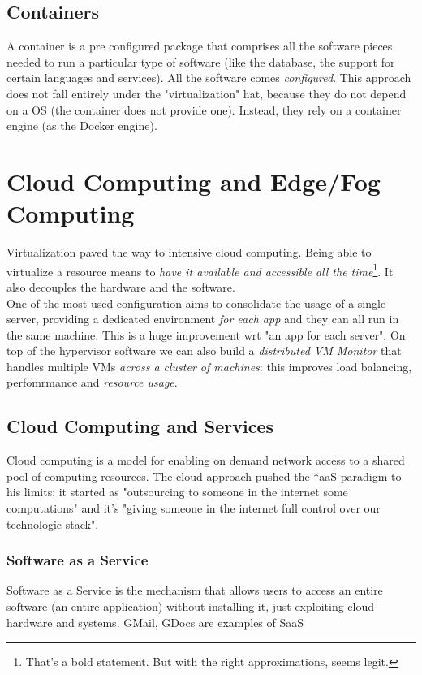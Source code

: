 \documentclass[10pt,a4paper]{article}
\begin{document}
			\subsection{Containers}
				A container is a pre configured package that comprises all the software pieces needed to run a particular type of software (like the database, the support for certain languages and services). All the software comes \emph{configured}. This approach does not fall entirely under the "virtualization" hat, because they do not depend on a OS (the container does not provide one). Instead, they rely on a container engine (as the Docker engine).
				
		\section{Cloud Computing and Edge/Fog Computing}
			Virtualization paved the way to intensive cloud computing. Being able to virtualize a resource means to \emph{have it available and accessible all the time}\footnote{That's a bold statement. But with the right approximations, seems legit.}. It also decouples the hardware and the software.\\
			One of the most used configuration aims to consolidate the usage of a single server, providing a dedicated environment \emph{for each app} and they can all run in the same machine. This is a huge improvement wrt "an app for each server". On top of the hypervisor software we can also build a \emph{distributed VM Monitor} that handles multiple VMs \emph{across a cluster of machines}: this improves load balancing, perfomrmance and \emph{resource usage}.\\
			
			\subsection{Cloud Computing and Services}
				Cloud computing is a model for enabling on demand network access to a shared pool of computing resources. The cloud approach pushed the *aaS paradigm to his limits: it started as "outsourcing to someone in the internet some computations" and it's "giving someone in the internet full control over our technologic stack".
				
				\subsubsection{Software as a Service}
					Software as a Service is the mechanism that allows users to access an entire software (an entire application) without installing it, just exploiting cloud hardware and systems. GMail, GDocs are examples of SaaS
				
\end{document}
